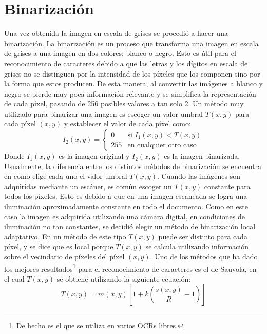 \documentclass[a4paper, 11pt, oneside]{report}
\begin{document}
\section{Binarización}
\label{sect:binarization}
Una vez obtenida la imagen en escala de grises se procedió a hacer una binarización. La binarización es un proceso que transforma una imagen en escala de grises a una imagen en dos colores: blanco o negro. Esto es útil para el reconocimiento de caracteres debido a que las letras y los dígitos en escala de grises no se distinguen por la intensidad de los píxeles que los componen sino por la forma que estos producen. De esta manera, al convertir las imágenes a blanco y negro se pierde muy poca información relevante y se simplifica la representación de cada píxel, pasando de 256 posibles valores a tan solo 2. Un método muy utilizado para binarizar una imagen es escoger un valor umbral $T(x,y)$ para cada píxel $(x,y)$ y establecer el valor de cada píxel como:
\begin{equation}\label{binEq}
I_2(x,y) = \left\{ \begin{array}{ll}
0 & \mbox{si $I_1(x,y) < T(x,y)$} \\
255 & \mbox{en cualquier otro caso}
\end{array} \right. 
\end{equation}
Donde $I_1(x,y)$ es la imagen original y $I_2(x,y)$ es la imagen binarizada. Usualmente, la diferencia entre los distintos métodos de binarización se encuentra en como elige cada uno el valor umbral $T(x,y)$.
Cuando las imágenes son adquiridas mediante un escáner, es común escoger un $T(x,y)$ constante para todos los píxeles. Esto es debido a que en una imagen escaneada se logra una iluminación aproximadamente constante en todo el documento. Como en este caso la imagen es adquirida utilizando una cámara digital, en condiciones de iluminación no tan constantes, se decidió elegir un método de binarización local adaptativo. En un método de este tipo $T(x,y)$ puede ser distinto para cada píxel, y se dice que es local porque $T(x,y)$ se calcula utilizando información sobre el vecindario de píxeles del píxel $(x,y)$. Uno de los métodos que ha dado los mejores resultados\footnote{De hecho es el que se utiliza en varios OCRs libres.} para el reconocimiento de caracteres es el de Sauvola, en el cual $T(x,y)$ se obtiene utilizando la siguiente ecuación:
\begin{equation}\label{rSauvola}
T(x,y)=m(x,y)\left[ 1 + k(\frac{s(x,y)}{R}-1) \right]
\end{equation}
\end{document}

